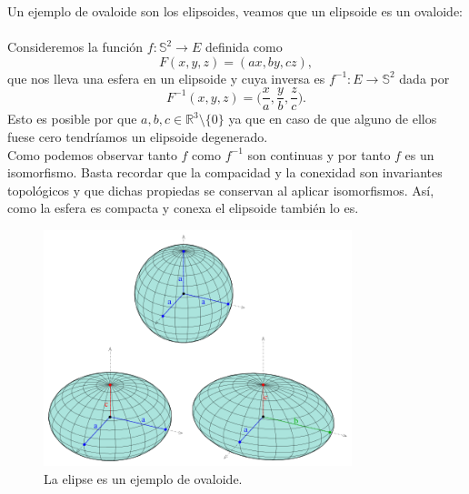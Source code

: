 \begin{ejemplo} 
	
	Un ejemplo de ovaloide son los elipsoides, veamos que un elipsoide es un ovaloide:
${ }$\\

	Consideremos la función $f : \mathbb{S}^2 \to E$ definida como
	\[
		F(x,y,z) = (ax,by,cz),
	\]
	que nos lleva una esfera en un elipsoide y cuya inversa es $f^{-1} : E \to \mathbb{S}^2$ dada por
	\[
		F^{-1} (x,y,z) = \Big(\frac x a, \frac y b, \frac z c \Big).
	\]
	Esto es posible por que $a,b,c \in \mathbb{R}^3 \setminus \{0\}$ ya que en caso de que alguno de ellos fuese cero tendríamos un elipsoide degenerado.
	${ }$\\
	
	Como podemos observar tanto $f$ como $f^{-1}$ son continuas y por tanto $f$ es un isomorfismo. Basta recordar que la compacidad y la conexidad son invariantes topológicos y que dichas propiedas se conservan al aplicar isomorfismos. Así, como la esfera es compacta y conexa el elipsoide también lo es.
	
	
	
		\begin{figure}
			\begin{center}
				\includegraphics[width=0.8\textwidth]{imagenes/ellipsoid.png}
			\end{center}
			\caption{La elipse es un ejemplo de ovaloide.}
			\label{fig:etiq_3}
		\end{figure}
		

\end{ejemplo}
